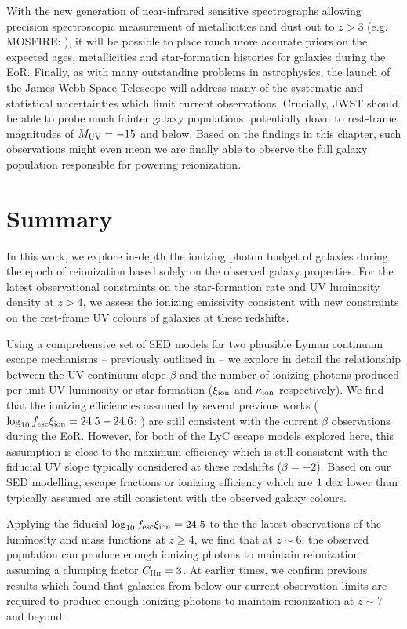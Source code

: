 With the new generation of near-infrared sensitive spectrographs allowing precision spectroscopic measurement of metallicities and dust out to $z >3$ (e.g. MOSFIRE: \citet{Kriek:2014uw}), it will be possible to place much more accurate priors on the expected ages, metallicities and star-formation histories for galaxies during the EoR. Finally, as with many outstanding problems in astrophysics, the launch of the James Webb Space Telescope will address many of the systematic and statistical uncertainties which limit current observations. Crucially, JWST should be able to probe much fainter galaxy populations, potentially down to rest-frame magnitudes of $M_{\rm{UV}} = -15$ and below. Based on the findings in this chapter, such observations might even mean we are finally able to observe the full galaxy population responsible for powering reionization.

\section{Summary}\label{sec:summary}
In this work, we explore in-depth the ionizing photon budget of galaxies during the epoch of reionization based solely on the observed galaxy properties. For the latest observational constraints on the star-formation rate and UV luminosity density at $z > 4$, we assess the ionizing emissivity consistent with new constraints on the rest-frame UV colours of galaxies at these redshifts.

Using a comprehensive set of SED models for two plausible Lyman continuum escape mechanisms -- previously outlined in \citet{Zackrisson:2013iz} -- we explore in detail the relationship between the UV continuum slope $\beta$ and the number of ionizing photons produced per unit UV luminosity or star-formation ($\xi_{\rm{ion}}$ and $\kappa_{\rm{ion}}$ respectively). We find that the ionizing efficiencies assumed by several previous works ($\log_{10} f_{\rm{esc}}\xi_{\rm{ion}} = 24.5-24.6$: \citet{Robertson:2013ji,Kuhlen:2012ka}) are still consistent with the current $\beta$ observations during the EoR. However, for both of the LyC escape models explored here, this assumption is close to the maximum efficiency which is still consistent with the fiducial UV slope typically considered at these redshifts ($\beta = -2$). Based on our SED modelling, escape fractions or ionizing efficiency which are $1~\rm{dex}$ lower than typically assumed are still consistent with the observed galaxy colours.

Applying the fiducial $\log_{10} f_{\rm{esc}}\xi_{\rm{ion}} = 24.5$ to the the latest observations of the luminosity and mass functions at $z\geq4$, we find that at $z\sim6$, the observed population can produce enough ionizing photons to maintain reionization assuming a clumping factor $C_{\textsc{Hii}} = 3$. At earlier times, we confirm previous results which found that galaxies from below our current observation limits are required to produce enough ionizing photons to maintain reionization at $z\sim7$ and beyond \citep{2010Natur.468...49R,Robertson:2013ji,Kuhlen:2012ka,Finkelstein:2012hr}.

